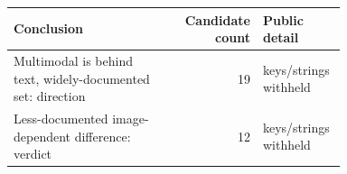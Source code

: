 \raggedright
\begin{tabular}{p{0.48\linewidth}rp{0.25\linewidth}}
\toprule
Conclusion & Candidate count & Public detail \\
\midrule
Multimodal is behind text, widely-documented set: direction & 19 & keys/strings withheld \\
Less-documented image-dependent difference: verdict & 12 & keys/strings withheld \\
\bottomrule
\end{tabular}
